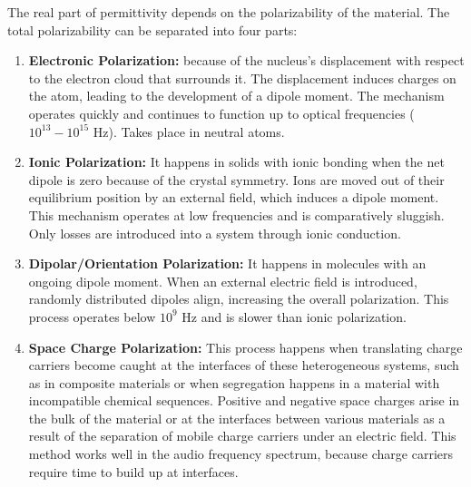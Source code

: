 	The real part of permittivity depends on the polarizability of the material. The total polarizability can be separated into four parts:\\
	\begin{enumerate}
		\item \textbf{Electronic Polarization:} because of the nucleus's displacement with respect to the electron cloud that surrounds it. The displacement induces charges on the atom, leading to the development of a dipole moment. The mechanism operates quickly and continues to function up to optical frequencies ($10^{13}-10^{15}$ Hz). Takes place in neutral atoms.\\
		\item \textbf{Ionic Polarization:} It happens in solids with ionic bonding when the net dipole is zero because of the crystal symmetry. Ions are moved out of their equilibrium position by an external field, which induces a dipole moment. This mechanism operates at low frequencies and is comparatively sluggish. Only losses are introduced into a system through ionic conduction.\\
		\item \textbf{Dipolar/Orientation Polarization:} It happens in molecules with an ongoing dipole moment. When an external electric field is introduced, randomly distributed dipoles align, increasing the overall polarization. This process operates below $10^9$ Hz and is slower than ionic polarization.\\
		\item \textbf{Space Charge Polarization:} This process happens when translating charge carriers become caught at the interfaces of these heterogeneous systems, such as in composite materials or when segregation happens in a material with incompatible chemical sequences. Positive and negative space charges arise in the bulk of the material or at the interfaces between various materials as a result of the separation of mobile charge carriers under an electric field. This method works well in the audio frequency spectrum, because charge carriers require time to build up at interfaces.
	\end{enumerate}
